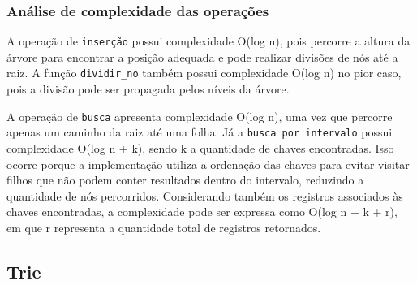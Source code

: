 \documentclass[12pt,a4paper]{article}
\begin{document}
\subsubsection{Análise de complexidade das operações}
A operação de \texttt{inserção} possui complexidade O(log n), pois percorre a altura da árvore para encontrar a posição adequada e pode realizar divisões de nós até a raiz. A função \texttt{dividir\_no} também possui complexidade O(log n) no pior caso, pois a divisão pode ser propagada pelos níveis da árvore.

A operação de \texttt{busca} apresenta complexidade O(log n), uma vez que percorre apenas um caminho da raiz até uma folha. Já a \texttt{busca por intervalo} possui complexidade O(log n + k), sendo k a quantidade de chaves encontradas. Isso ocorre porque a implementação utiliza a ordenação das chaves para evitar visitar filhos que não podem conter resultados dentro do intervalo, reduzindo a quantidade de nós percorridos. Considerando também os registros associados às chaves encontradas, a complexidade pode ser expressa como O(log n + k + r), em que r representa a quantidade total de registros retornados.

\subsection{Trie}
\end{document}
